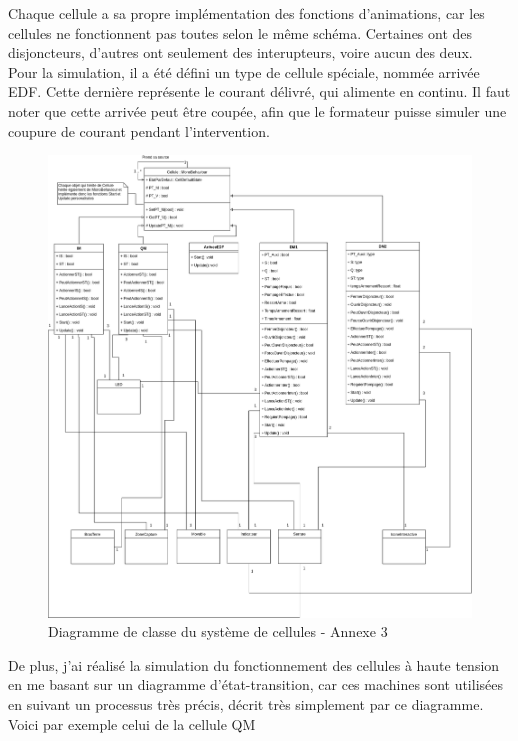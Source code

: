 \documentclass[a4paper]{article}
\begin{document}
    Chaque cellule a sa propre implémentation des fonctions d'animations, car les cellules ne fonctionnent pas toutes selon le même schéma. Certaines ont des disjoncteurs, d'autres ont seulement des interupteurs, voire aucun des deux. \\

    Pour la simulation, il a été défini un type de cellule spéciale, nommée arrivée EDF. Cette dernière représente le courant délivré, qui alimente en continu. Il faut noter que cette arrivée peut être coupée, afin que le formateur puisse simuler une coupure de courant pendant l'intervention. \\

    \begin{figure}[H]
        \centering
        \includegraphics[scale=0.3]{img/DiagClassCellules}
        \caption{Diagramme de classe du système de cellules - Annexe 3}
    \end{figure}

    De plus, j'ai réalisé la simulation du fonctionnement des cellules à haute tension en me basant sur un diagramme d'état-transition, car ces machines sont utilisées en suivant un processus très précis, décrit très simplement par ce diagramme. Voici par exemple celui de la cellule QM \\
\end{document}
